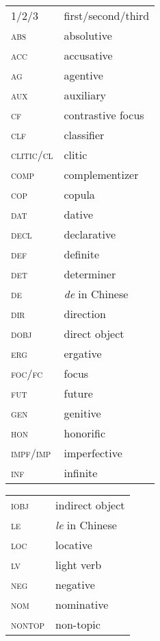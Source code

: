 
\begin{multicols}{2} 


\begin{tabular}{lp{4.5cm}} 
\textsc{1}/\textsc{2}/\textsc{3} & first/second/third \\ 
\textsc{abs} & absolutive \\ 
\textsc{acc} & accusative \\ 
\textsc{ag} & agentive \\ 
\textsc{aux} & auxiliary \\ 
\textsc{cf} & contrastive focus \\ 
\textsc{clf} & classifier \\ 
\textsc{clitic}/\textsc{cl} & clitic \\ 
\textsc{comp} & complementizer \\ 
\textsc{cop} & copula \\ 
\textsc{dat} & dative \\ 
\textsc{decl} & declarative \\ 
\textsc{def} & definite \\ 
\textsc{det} & determiner \\ 
\textsc{de} & \textit{de} in Chinese \\ 
\textsc{dir} & direction \\ 
\textsc{dobj} & direct object \\ 
\textsc{erg} & ergative \\ 
\textsc{foc}/\textsc{fc} & focus \\ 
\textsc{fut} & future \\ 
\textsc{gen} & genitive \\ 
\textsc{hon} & honorific \\ 
\textsc{impf}/\textsc{imp} & imperfective \\ 
\textsc{inf} & infinite \\ 
\end{tabular}
%
\begin{tabular}{lp{4.5cm}} 
\textsc{iobj} & indirect object \\ 
\textsc{le} & \textit{le} in Chinese \\ 
\textsc{loc} & locative \\ 
\textsc{lv} & light verb \\ 
\textsc{neg} & negative \\ 
\textsc{nom} & nominative \\ 
\textsc{nontop} & non-topic \\ 

\end{tabular}
\end{multicols}
